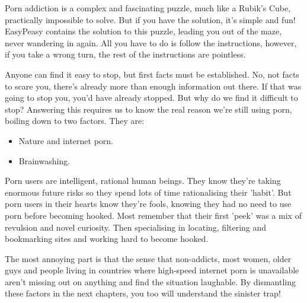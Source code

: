 \documentclass[easypeasy.tex]{subfiles}
\begin{document}
Porn addiction is a complex and fascinating puzzle, much like a Rubik's Cube, practically impossible to solve. But if you have the solution, it's simple and fun! EasyPeasy contains the solution to this puzzle, leading you out of the maze, never wandering in again. All you have to do is follow the instructions, however, if you take a wrong turn, the rest of the instructions are pointless.

Anyone can find it easy to stop, but first facts must be established. No, not facts to scare you, there's already more than enough information out there. If that was going to stop you, you'd have already stopped. But why do we find it difficult to stop? Answering this requires us to know the real reason we're still using porn, boiling down to two factors. They are:
\begin{itemize}
  \item Nature and internet porn.
  \item Brainwashing.
\end{itemize}

Porn users are intelligent, rational human beings. They know they're taking enormous future risks so they spend lots of time rationalising their 'habit'. But porn users in their hearts know they're fools, knowing they had no need to use porn before becoming hooked. Most remember that their first 'peek' was a mix of revulsion and novel curiosity. Then specialising in locating, filtering and bookmarking sites and working hard to become hooked.

The most annoying part is that the sense that non-addicts, most women, older guys and people living in countries where high-speed internet porn is unavailable aren't missing out on anything and find the situation laughable. By dismantling these factors in the next chapters, you too will understand the sinister trap!
\end{document}
